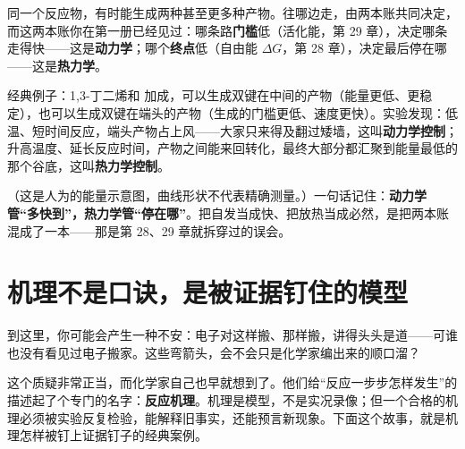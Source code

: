\begin{qiaoliang}
同一个反应物，有时能生成两种甚至更多种产物。往哪边走，由两本账共同决定，而这两本账你在第一册已经见过：哪条路\textbf{门槛}低（活化能，第 29 章），决定哪条走得快——这是\textbf{动力学}；哪个\textbf{终点}低（自由能 $\Delta G$，第 28 章），决定最后停在哪——这是\textbf{热力学}。

经典例子：1,3-丁二烯和  加成，可以生成双键在中间的产物（能量更低、更稳定），也可以生成双键在端头的产物（生成的门槛更低、速度更快）。实验发现：低温、短时间反应，端头产物占上风——大家只来得及翻过矮墙，这叫\textbf{动力学控制}；升高温度、延长反应时间，产物之间能来回转化，最终大部分都汇聚到能量最低的那个谷底，这叫\textbf{热力学控制}。

\begin{center}
\end{center}

（这是人为的能量示意图，曲线形状不代表精确测量。）一句话记住：\textbf{动力学管“多快到”，热力学管“停在哪”}。把自发当成快、把放热当成必然，是把两本账混成了一本——那是第 28、29 章就拆穿过的误会。
\end{qiaoliang}

\section{机理不是口诀，是被证据钉住的模型}

到这里，你可能会产生一种不安：电子对这样搬、那样搬，讲得头头是道——可谁也没有看见过电子搬家。这些弯箭头，会不会只是化学家编出来的顺口溜？

这个质疑非常正当，而化学家自己也早就想到了。他们给“反应一步步怎样发生”的描述起了个专门的名字：\textbf{反应机理}。机理是模型，不是实况录像；但一个合格的机理必须被实验反复检验，能解释旧事实，还能预言新现象。下面这个故事，就是机理怎样被钉上证据钉子的经典案例。

